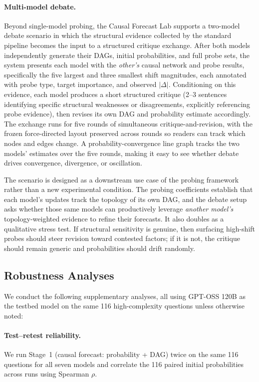 \documentclass[11pt]{article}
\begin{document}
\paragraph{Multi-model debate.} Beyond single-model probing, the Causal Forecast Lab supports a two-model debate scenario in which the structural evidence collected by the standard pipeline becomes the input to a structured critique exchange. After both models independently generate their DAGs, initial probabilities, and full probe sets, the system presents each model with the \emph{other's} causal network and probe results, specifically the five largest and three smallest shift magnitudes, each annotated with probe type, target importance, and observed $|\Delta|$. Conditioning on this evidence, each model produces a short structured critique (2--3 sentences identifying specific structural weaknesses or disagreements, explicitly referencing probe evidence), then revises its own DAG and probability estimate accordingly. The exchange runs for five rounds of simultaneous critique-and-revision, with the frozen force-directed layout preserved across rounds so readers can track which nodes and edges change. A probability-convergence line graph tracks the two models' estimates over the five rounds, making it easy to see whether debate drives convergence, divergence, or oscillation.

The scenario is designed as a downstream use case of the probing framework rather than a new experimental condition. The probing coefficients establish that each model's updates track the topology of its own DAG, and the debate setup asks whether those same models can productively leverage \emph{another model's} topology-weighted evidence to refine their forecasts. It also doubles as a qualitative stress test. If structural sensitivity is genuine, then surfacing high-shift probes should steer revision toward contested factors; if it is not, the critique should remain generic and probabilities should drift randomly.

\subsection{Robustness Analyses}

We conduct the following supplementary analyses, all using GPT-OSS 120B as the testbed model on the same 116 high-complexity questions unless otherwise noted:

\paragraph{Test--retest reliability.} We run Stage~1 (causal forecast: probability + DAG) twice on the same 116 questions for all seven models and correlate the 116 paired initial probabilities across runs using Spearman $\rho$.
\end{document}
